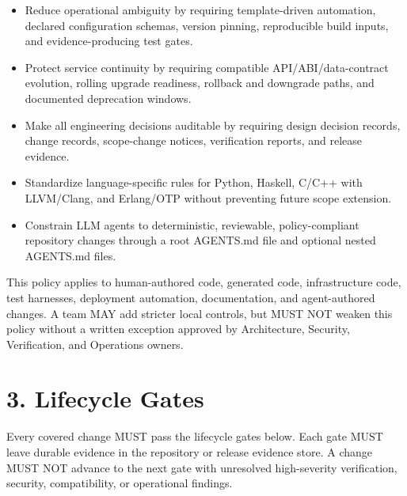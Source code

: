 \documentclass[11pt]{article}
\begin{document}
\begin{itemize}
  \item Reduce operational ambiguity by requiring template-driven automation, declared configuration schemas, version pinning, reproducible build inputs, and evidence-producing test gates.
  \item Protect service continuity by requiring compatible API/ABI/data-contract evolution, rolling upgrade readiness, rollback and downgrade paths, and documented deprecation windows.
  \item Make all engineering decisions auditable by requiring design decision records, change records, scope-change notices, verification reports, and release evidence.
  \item Standardize language-specific rules for Python, Haskell, C/C++ with LLVM/Clang, and Erlang/OTP without preventing future scope extension.
  \item Constrain LLM agents to deterministic, reviewable, policy-compliant repository changes through a root AGENTS.md file and optional nested AGENTS.md files.
\end{itemize}
This policy applies to human-authored code, generated code, infrastructure code, test harnesses, deployment automation, documentation, and agent-authored changes. A team MAY add stricter local controls, but MUST NOT weaken this policy without a written exception approved by Architecture, Security, Verification, and Operations owners.


\hypertarget{sec-lifecycle-gates}{}
\section*{3. Lifecycle Gates}
Every covered change MUST pass the lifecycle gates below. Each gate MUST leave durable evidence in the repository or release evidence store. A change MUST NOT advance to the next gate with unresolved high-severity verification, security, compatibility, or operational findings.
\end{document}
